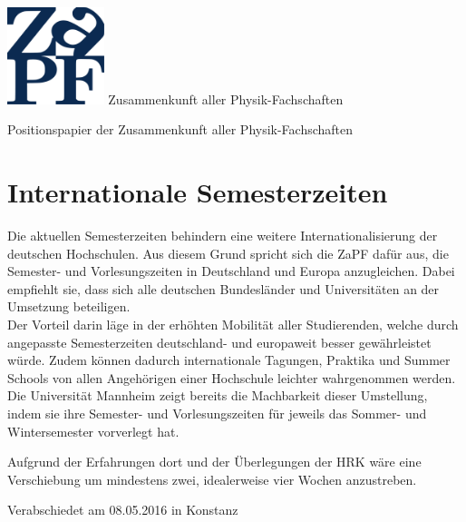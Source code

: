 \documentclass[DIV=calc]{scrartcl}
\begin{document}
\hspace{0.87\textwidth}
\begin{minipage}{120pt}
\vspace{-1.8cm}
\includegraphics[width=80pt]{logo.pdf}
\centering
\small Zusammenkunft aller Physik-Fachschaften
\end{minipage}
\begin{center}
\huge{Positionspapier der Zusammenkunft aller Physik-Fachschaften} \\
\normalsize
\end{center}

\vspace{1cm}
\section*{Internationale Semesterzeiten}

Die aktuellen Semesterzeiten behindern eine weitere Internationalisierung der deutschen Hochschulen. Aus diesem Grund spricht sich die ZaPF daf\"ur aus, die Semester- und Vorlesungszeiten in Deutschland und Europa anzugleichen. Dabei empfiehlt sie, dass sich alle deutschen Bundesl\"ander und Universit\"aten an der Umsetzung beteiligen. \\
Der Vorteil darin l\"age in der erh\"ohten Mobilit\"at aller Studierenden, welche durch angepasste Semesterzeiten deutschland- und europaweit besser gew\"ahrleistet w\"urde. Zudem k\"onnen dadurch internationale Tagungen, Praktika und Summer Schools von allen Angeh\"origen einer Hochschule leichter wahrgenommen werden.\\
Die Universit\"at Mannheim zeigt bereits die Machbarkeit dieser Umstellung, indem sie ihre Semester- und Vorlesungszeiten f\"ur jeweils das Sommer- und Wintersemester vorverlegt hat.

Aufgrund der Erfahrungen dort und der \"Uberlegungen der HRK w\"are eine Verschiebung um mindestens zwei, idealerweise vier Wochen anzustreben.

\vfill
\begin{flushright}
Verabschiedet am 08.05.2016 in Konstanz
\end{flushright}
\end{document}
